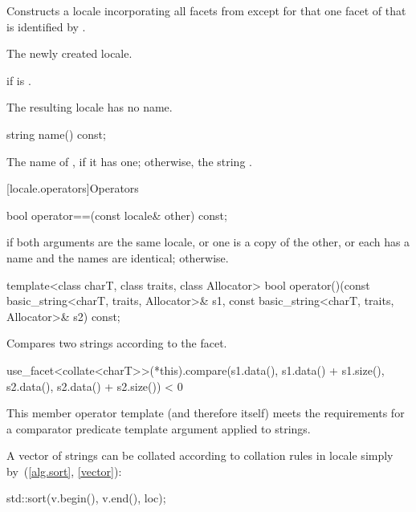 \begin{itemdescr}
\pnum
\effects
Constructs a locale incorporating all facets from 
except for that one facet of  that is identified by .

\pnum
\returns
The newly created locale.

\pnum
\throws
{} if  is .

\pnum
\remarks
The resulting locale has no name.
\end{itemdescr}

%
\begin{itemdecl}
string name() const;
\end{itemdecl}

\begin{itemdescr}
\pnum
\returns
The name of , if it has one;
otherwise, the string .
\end{itemdescr}

[locale.operators]{Operators}

%
\begin{itemdecl}
bool operator==(const locale& other) const;
\end{itemdecl}

\begin{itemdescr}
\pnum
\returns
{} if
both arguments are the same locale, or
one is a copy of the other, or
each has a name and the names are identical;
 otherwise.
\end{itemdescr}

%
\begin{itemdecl}
template<class charT, class traits, class Allocator>
  bool operator()(const basic_string<charT, traits, Allocator>& s1,
                  const basic_string<charT, traits, Allocator>& s2) const;
\end{itemdecl}

\begin{itemdescr}
\pnum
\effects
Compares two strings according to the  facet.

\pnum
\returns
\begin{codeblock}
use_facet<collate<charT>>(*this).compare(s1.data(), s1.data() + s1.size(),
                                         s2.data(), s2.data() + s2.size()) < 0
\end{codeblock}

\pnum
\remarks
This member operator template (and therefore  itself)
meets the requirements for
a comparator predicate template argument applied to strings.

\pnum
\begin{example}
A vector of strings 
can be collated according to collation rules in locale 
simply by~(\ref{alg.sort}, \ref{vector}):
\begin{codeblock}
std::sort(v.begin(), v.end(), loc);
\end{codeblock}
\end{example}
\end{itemdescr}

